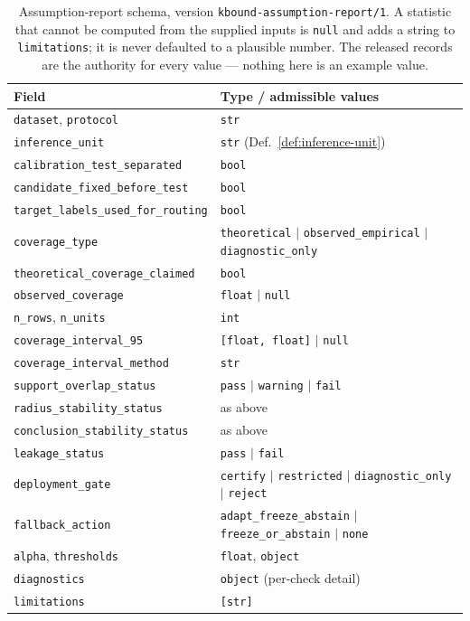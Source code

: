 \providecommand{\bk}{\discretionary{}{}{}}
\begin{table}[htbp]
\centering
\small
\caption{Assumption-report schema, version \texttt{kbound-assumption-report/1}. A
statistic that cannot be computed from the supplied inputs is \texttt{null} and adds a
string to \texttt{limitations}; it is never defaulted to a plausible number. The released
records are the authority for every value --- nothing here is an example value.}
\label{tab:report-schema}
\begin{tabular}{@{}p{}p{}@{}}
\toprule
Field & Type / admissible values \\
\midrule
\texttt{dataset}, \texttt{protocol} & \texttt{str} \\
\texttt{inference\bk \_unit} & \texttt{str} (Def.~\ref{def:inference-unit}) \\
\texttt{calibration\bk \_test\bk \_separated} & \texttt{bool} \\
\texttt{candidate\bk \_fixed\bk \_before\bk \_test} & \texttt{bool} \\
\texttt{target\bk \_labels\bk \_used\bk \_for\bk \_routing} & \texttt{bool} \\
\texttt{coverage\bk \_type} & \texttt{theoretical} $\mid$ \texttt{observed\bk \_empirical} $\mid$ \texttt{diagnostic\bk \_only} \\
\texttt{theoretical\bk \_coverage\bk \_claimed} & \texttt{bool} \\
\texttt{observed\bk \_coverage} & \texttt{float} $\mid$ \texttt{null} \\
\texttt{n\bk \_rows}, \texttt{n\bk \_units} & \texttt{int} \\
\texttt{coverage\bk \_interval\bk \_95} & \texttt{[float, float]} $\mid$ \texttt{null} \\
\texttt{coverage\bk \_interval\bk \_method} & \texttt{str} \\
\texttt{support\bk \_overlap\bk \_status} & \texttt{pass} $\mid$ \texttt{warning} $\mid$ \texttt{fail} \\
\texttt{radius\bk \_stability\bk \_status} & as above \\
\texttt{conclusion\bk \_stability\bk \_status} & as above \\
\texttt{leakage\bk \_status} & \texttt{pass} $\mid$ \texttt{fail} \\
\texttt{deployment\bk \_gate} & \texttt{certify} $\mid$ \texttt{restricted} $\mid$ \texttt{diagnostic\bk \_only} $\mid$ \texttt{reject} \\
\texttt{fallback\bk \_action} & \texttt{adapt\bk \_freeze\bk \_abstain} $\mid$ \texttt{freeze\bk \_or\bk \_abstain} $\mid$ \texttt{none} \\
\texttt{alpha}, \texttt{thresholds} & \texttt{float}, \texttt{object} \\
\texttt{diagnostics} & \texttt{object} (per-check detail) \\
\texttt{limitations} & \texttt{[str]} \\
\bottomrule
\end{tabular}
\end{table}


